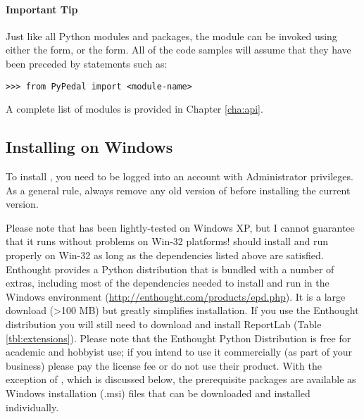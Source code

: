 \paragraph*{Important Tip} \label{sec:tip:from-pypedal-import} Just like all Python modules and packages, the \PyPedal{} module can be invoked using either the  form, or the  form.  All of the code samples will assume that they have been preceded by statements such as:
\begin{verbatim}
>>> from PyPedal import <module-name>
\end{verbatim}
A complete list of modules is provided in Chapter \ref{cha:api}.

\subsection{Installing on Windows}\label{sec:installing-windows}
To install \PyPedal{}, you need to be logged into an account with Administrator privileges.  As a general rule, always remove any old version of \PyPedal{} before installing the current version.

Please note that \PyPedal{} has been lightly-tested on Windows XP, but I cannot guarantee that it runs without problems on Win-32 platforms!  \PyPedal{} should install and run properly on Win-32 as long as the dependencies listed above are satisfied. Enthought provides a Python distribution that is bundled with a number of extras, including most of the dependencies needed to install and run \PyPedal{} in the Windows environment (\url{http://enthought.com/products/epd.php}). It is a large download (>100 MB) but greatly simplifies installation. If you use the Enthought distribution you will still need to download and install ReportLab (Table \ref{tbl:extensions}). Please note that the Enthought Python Distribution is free for academic and hobbyist use; if you intend to use it commercially (as part of your business) please pay the license fee or do not use their product. With the exception of , which is discussed below, the prerequisite packages are available as Windows installation (.msi) files that can be downloaded and installed individually.


